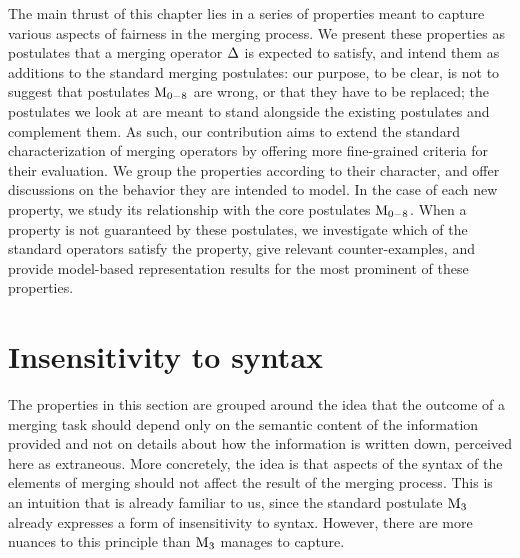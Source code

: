 The main thrust of this chapter lies in a series of properties 
meant to capture various aspects of fairness in the merging process.
We present these properties as postulates that 
a merging operator $\Delta$ is expected to satisfy,
and intend them as additions to 
the standard merging postulates:
our purpose, to be clear, is not to suggest that 
postulates $\mathrm{M}_{0-8}$ are wrong, or that they have 
to be replaced; the postulates we look at are meant 
to stand alongside the existing postulates and complement them.
As such, our contribution aims to extend the standard characterization
of merging operators 
by offering more fine-grained criteria for their evaluation.
We group the properties according to their character, 
and offer discussions on the behavior they are intended to model.
In the case of each new property, we study its 
relationship with the core postulates $\mathrm{M}_{0-8}$.
When a property is not guaranteed by these postulates, 
we investigate which of the standard operators 
satisfy the property,
give relevant counter-examples, 
and provide model-based representation results for the most prominent of these properties.






























\section{Insensitivity to syntax}\label{sec:5-syntax}
The properties in this section are grouped around the idea that the outcome
of a merging task should depend only on the semantic content of the information provided
and not on details about how the information is written down,
perceived here as extraneous.
More concretely, the idea is that aspects 
of the syntax of the elements of merging 
should not affect the result of the merging process.
This is an intuition that is already familiar to us,
since the standard postulate $\mathrm{M}_{3}$ already expresses 
a form of insensitivity to syntax. 
However, there are more nuances to this 
principle than $\mathrm{M}_{3}$ manages to capture.

